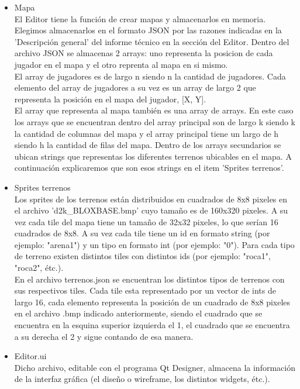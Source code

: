 \documentclass[titlepage,a4paper,12pt]{article}
\begin{document}
\begin{itemize}

\item Mapa\\

El Editor tiene la función de crear mapas y almacenarlos en memoria. Elegimos almacenarlos en el formato JSON por las razones indicadas en la 'Descripción general' del informe técnico en la sección del Editor. Dentro del archivo JSON se almacenas 2 arrays: uno representa la posicion de cada jugador en el mapa y el otro reprenta al mapa en si mismo. \\

El array de jugadores es de largo n siendo n la cantidad de jugadores. Cada elemento del array de jugadores a su vez es un array de largo 2 que representa la posición en el mapa del jugador, [X, Y]. \\

El array que representa al mapa también es una array de arrays. En este caso los arrays que se encuentran dentro del array principal son de largo k siendo k la cantidad de columnas del mapa y el array principal tiene un largo de h siendo h la cantidad de filas del mapa. Dentro de los arrays secundarios se ubican strings que representas los diferentes terrenos ubicables en el mapa. A continuación explicaremos que son esos strings en el item 'Sprites terrenos'.

\item Sprites terrenos\\

Los sprites de los terrenos están distribuidos en cuadrados de 8x8 pixeles en el archivo 'd2k\_BLOXBASE.bmp' cuyo tamaño es de 160x320 pixeles. A su vez cada tile del mapa tiene un tamaño de 32x32 pixeles, lo que serían 16 cuadrados de 8x8. A su vez cada tile tiene un id en formato string (por ejemplo: "arena1") y un tipo en formato int (por ejemplo: "0"). Para cada tipo de terreno existen distintos tiles con distintos ids (por ejemplo: "roca1", "roca2", étc.).\\

En el archivo terrenos.json se encuentran los distintos tipos de terrenos con sus respectivos tiles. Cada tile esta representado por un vector de ints de largo 16, cada elemento representa la posición de un cuadrado de 8x8 pixeles en el archivo .bmp indicado anteriormente, siendo el cuadrado que se encuentra en la esquina superior izquierda el 1, el cuadrado que se encuentra a su derecha el 2 y sigue contando de esa manera.

\item Editor.ui\\

Dicho archivo, editable con el programa Qt Designer, almacena la información de la interfaz gráfica (el diseño o wireframe, los distintos widgets, étc.).

\end{itemize}
\end{document}
